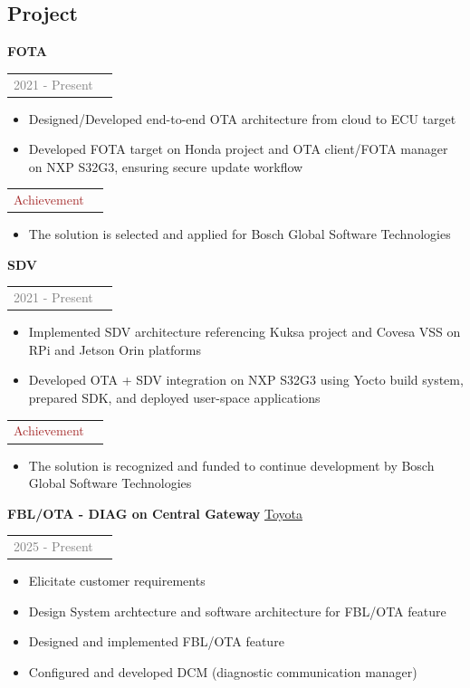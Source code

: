 \documentclass[11pt]{article}
\begin{document}
\subsection*{Project}
\textbf{FOTA}
\begin{tabular}{ll}
\textcolor{gray}{2021 - Present} 
\end{tabular}
\begin{itemize}
    \item Designed/Developed end-to-end OTA architecture from cloud to ECU target
    \item Developed FOTA target on Honda project and OTA client/FOTA manager on NXP S32G3, ensuring secure update workflow
\end{itemize}
\begin{tabular}{ll}
\textcolor{brown}{Achievement} 
\end{tabular}
\begin{itemize}
    \item The solution is selected and applied for Bosch Global Software Technologies
\end{itemize}

\textbf{SDV}
\begin{tabular}{ll}
\textcolor{gray}{2021 - Present} 
\end{tabular}
\begin{itemize}
    \item Implemented SDV architecture referencing Kuksa project and Covesa VSS on RPi and Jetson Orin platforms
    \item Developed OTA + SDV integration on NXP S32G3 using Yocto build system, prepared SDK, and deployed user-space applications
\end{itemize}
\begin{tabular}{ll}
\textcolor{brown}{Achievement} 
\end{tabular}
\begin{itemize}
    \item The solution is recognized and funded to continue development by Bosch Global Software Technologies
\end{itemize}

\textbf{FBL/OTA - DIAG on Central Gateway} \underline{Toyota}
\begin{tabular}{ll}
\textcolor{gray}{2025 - Present} 
\end{tabular}
\begin{itemize}
    \item Elicitate customer requirements
    \item Design System archtecture and software architecture for FBL/OTA feature
    \item Designed and implemented FBL/OTA feature
    \item Configured and developed DCM (diagnostic communication manager)
\end{itemize}
\end{document}
